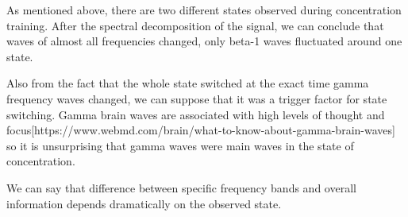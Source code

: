 \par As mentioned above, there are two different states observed during concentration training. After the spectral decomposition of the signal, we can conclude that waves of almost all frequencies changed, only beta-1 waves fluctuated around one state. 
\par Also from the fact that the whole state switched at the exact time gamma frequency waves changed, we can suppose that it was a trigger factor for state switching. Gamma brain waves are associated with high levels of thought and focus[https://www.webmd.com/brain/what-to-know-about-gamma-brain-waves] so it is unsurprising that gamma waves were main waves in the state of concentration.
\par We can say that difference between specific frequency bands and overall information depends dramatically on the observed state.



 
